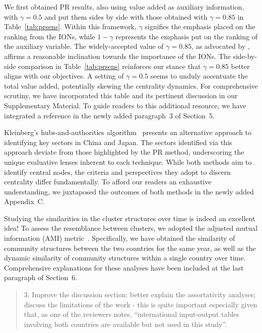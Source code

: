 \documentclass[12pt]{article}
\newenvironment{comment}%
{\begin{quotation}\noindent\small\it\color{darkblue}\ignorespaces%
}{\end{quotation}}
\begin{document}
We first obtained PR results, also using value added as auxiliary information,
with $\gamma = 0.5$ and put them sides by side with those obtained with
$\gamma = 0.85$ in Table~\ref{tab:prsens}. Within this framework, $\gamma$
signifies the emphasis placed on the ranking from the IONs, while $1 - \gamma$
represents the emphasis put on the ranking of the auxiliary variable. The
widely-accepted value of $\gamma = 0.85$, as advocated by
\citet{page1998pagerank}, affirms a reasonable inclination towards the
importance of the IONs. The side-by-side comparison in Table~\ref{tab:prsens}
reinforces our stance that $\gamma = 0.85$ better aligns with our objectives. A
setting of $\gamma = 0.5$ seems to unduly accentuate the total value added,
potentially skewing the centrality dynamics. For comprehensive scrutiny, we have
incorporated this table and its pertinent discussion in our Supplementary
Material. To guide readers to this additional resource, we have integrated a
reference in the newly added paragraph~3 of Section~5.


Kleinberg's hubs-and-authorities algorithm~\citep{kleinberg1999authoritative}
presents an alternative approach to identifying key sectors in China and
Japan. The sectors identified via this approach deviate from those highlighted
by the PR method, underscoring the unique evaluative lenses inherent to each
technique. While both methods aim to identify central nodes, the criteria and
perspectives they adopt to discern centrality differ fundamentally. To afford
our readers an exhaustive understanding, we juxtaposed the outcomes of both
methods in the newly added Appendix~C.


Studying the similarities in the cluster structures over time is indeed an
excellent idea! To assess the resemblance between clusters, we adopted the
adjusted mutual information (AMI) metric~\citep{vinh2009information,
  vinh2010information}. Specifically, we have obtained the similarity of 
community structures between the two countries for the same year, as well as 
the dynamic similarity of community structures within a single country over 
time. Comprehensive explanations for these analyses have been included at the 
last paragraph of Section~6.


\begin{comment}
3. Improve the discussion section: better explain the assortativity analyses;
discuss the limitations of the work - this is quite important especially 
given that, as one of the reviewers notes, ``international input-output 
tables involving both countries are available but not used in this study''.
\end{comment} 
\end{document}
